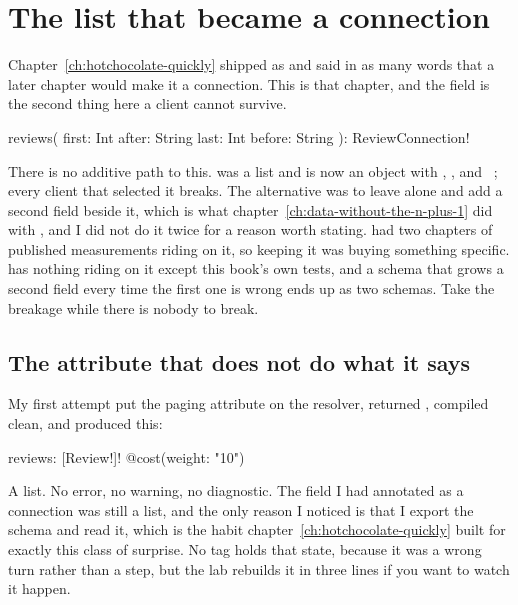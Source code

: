 \section{The list that became a connection}
\label{sec:ch05-the-list-that-became-a-connection}

Chapter~\ref{ch:hotchocolate-quickly} shipped  as
\code{[Review!]!} and said in as many words that a later chapter would make it
a connection. This is that chapter, and the field is the second thing here a
client cannot survive.

\begin{graphqlsdl}
reviews(
  first: Int
  after: String
  last: Int
  before: String
): ReviewConnection!
\end{graphqlsdl}

There is no additive path to this.  was a list and is now an
object with , ,  and
~\autocite{relay2026connections}; every client that selected it
breaks. The alternative was to leave  alone and add a second field
beside it, which is what chapter~\ref{ch:data-without-the-n-plus-1} did with
, and I did not do it twice for a reason worth stating.
 had two chapters of published measurements riding on it, so
keeping it was buying something specific.  has nothing riding on
it except this book's own tests, and a schema that grows a second field every
time the first one is wrong ends up as two schemas. Take the breakage while
there is nobody to break.

\subsection*{The attribute that does not do what it says}

%
My first attempt put the paging attribute on the resolver, returned
, compiled clean, and produced this:

\begin{graphqlsdl}
reviews: [Review!]! @cost(weight: "10")
\end{graphqlsdl}

A list. No error, no warning, no diagnostic. The field I had annotated as a
connection was still a list, and the only reason I noticed is that I export the
schema and read it, which is the habit
chapter~\ref{ch:hotchocolate-quickly} built for exactly this class of surprise.
No tag holds that state, because it was a wrong turn rather than a step, but the
lab rebuilds it in three lines if you want to watch it happen.

